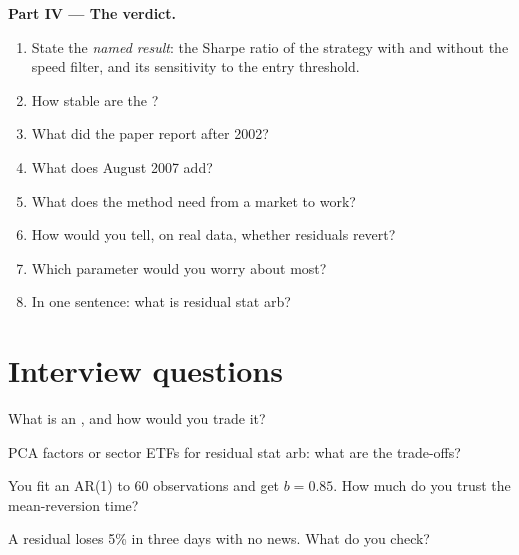 \begin{problem}
\medskip\noindent\textbf{Part IV --- The verdict.}
\begin{enumerate}[resume]
\item State the \emph{named result}: the Sharpe ratio of the  strategy with and without the speed filter, and its sensitivity to the entry threshold.
\item How stable are the ?
\item What did the paper report after 2002?
\item What does August 2007 add?
\item What does the method need from a market to work?
\item How would you tell, on real data, whether residuals revert?
\item Which parameter would you worry about most?
\item In one sentence: what is residual stat arb?
\end{enumerate}
\end{problem}

\section{Interview questions}

\begin{interviewq}\label{iq:s1:residual-and-principal-component-stat-arb:1}
What is an , and how would you trade it?
\end{interviewq}

\begin{interviewq}\label{iq:s1:residual-and-principal-component-stat-arb:2}
PCA factors or sector ETFs for residual stat arb: what are the trade-offs?
\end{interviewq}

\begin{interviewq}\label{iq:s1:residual-and-principal-component-stat-arb:3}
You fit an AR(1) to 60 observations and get $b = 0.85$. How much do you trust the mean-reversion time?
\end{interviewq}

\begin{interviewq}\label{iq:s1:residual-and-principal-component-stat-arb:4}
A residual  loses 5\% in three days with no news. What do you check?
\end{interviewq}

